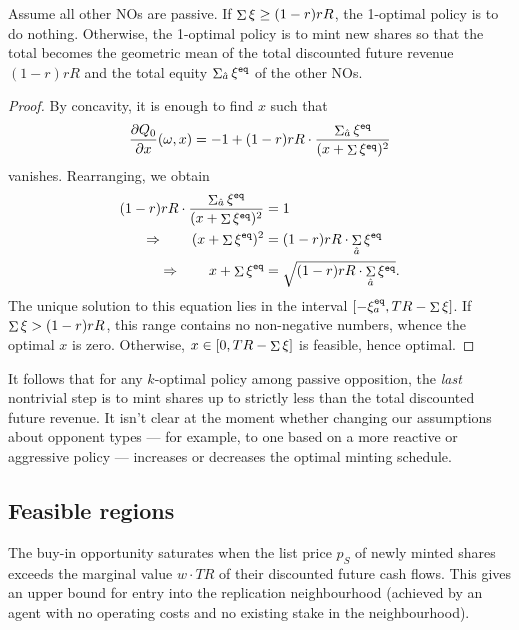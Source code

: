 \begin{proposition}
  \label{thm:1-optimal-policy}

  Assume all other NOs are passive.
  If $\mathop{\Sigma}\xi\geq (1-r)rR$, the 1-optimal policy is to do nothing.
  Otherwise, the 1-optimal policy is to mint new shares so that the total becomes the geometric mean of the total discounted future revenue $(1-r)rR$ and the total equity $\mathop{\Sigma}_{\hat{a}} \xi^{\mathtt{eq}}$ of the other NOs.

\end{proposition}
%
\begin{proof}

  By concavity, it is enough to find $x$ such that 
  \[
    \frac{\partial Q_0}{\partial x}(\omega,x) = -1 + (1-r) rR \cdot\frac{\mathop{\Sigma}_{\hat{a}} \xi^{\mathtt{eq}}}{(x+\mathop{\Sigma} \xi^{\mathtt{eq}})^2}
  \]
  vanishes.
  Rearranging, we obtain
  \begin{align*}
     (1-r)rR\cdot\frac{\mathop{\Sigma}_{\hat{a}} \xi^{\mathtt{eq}}}{(x + \mathop{\Sigma} \xi^{\mathtt{eq}})^2} &= 1 \\
    \Rightarrow\qquad (x + \mathop{\Sigma} \xi^{\mathtt{eq}})^2 &= (1-r)rR \cdot \mathop{\Sigma}_{\hat{a}} \xi^{\mathtt{eq}} \\
    \Rightarrow\qquad x + \mathop{\Sigma} \xi^{\mathtt{eq}} &= \sqrt{ (1-r)rR\cdot \mathop{\Sigma}_{\hat{a}} \xi^{\mathtt{eq}} }.
  \end{align*}
  The unique solution to this equation lies in the interval $[-\xi_a^{\mathtt{eq}},TR-\mathop{\Sigma}\xi]$.
  If $\mathop{\Sigma}\xi > (1-r)rR$, this range contains no non-negative numbers, whence the optimal $x$ is zero.
  Otherwise, $x\in [0,TR-\mathop{\Sigma}\xi]$ is feasible, hence optimal. \qedhere

\end{proof}

It follows that for any $k$-optimal policy among passive opposition, the \emph{last} nontrivial step is to mint shares up to strictly less than the total discounted future revenue.
%
It isn't clear at the moment whether changing our assumptions about opponent types --- for example, to one based on a more reactive or aggressive policy --- increases or decreases the optimal minting schedule.




\subsection{Feasible regions}

The buy-in opportunity saturates when the list price $p_S$ of newly minted shares exceeds the marginal value $w\cdot TR$ of their discounted future cash flows. This gives an upper bound for entry into the replication neighbourhood (achieved by an agent with no operating costs and no existing stake in the neighbourhood).


